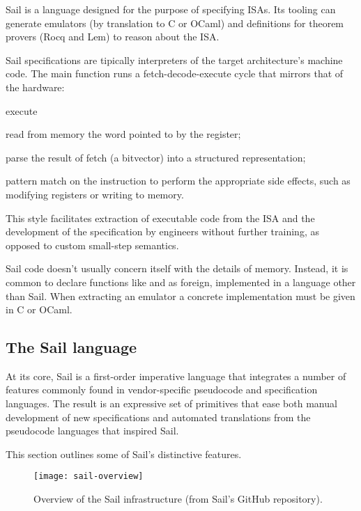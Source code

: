 Sail \cite{Armstrong} is a language designed for the purpose of specifying ISAs. Its tooling can generate emulators (by translation to C or OCaml) and definitions for theorem provers (\eg Rocq and Lem) to reason about the ISA.

Sail specifications are tipically interpreters of the target architecture's machine code. The main function runs a fetch-decode-execute cycle that mirrors that of the hardware:
\begin{labeling}[~--]{execute}
\item[fetch] read from memory the word pointed to by the  register;
\item[decode] parse the result of fetch (a bitvector) into a structured representation;
\item[execute] pattern match on the instruction to perform the appropriate side effects, such as modifying registers or writing to memory.
\end{labeling}

This style facilitates extraction of executable code from the ISA and the development of the specification by engineers without further training, as opposed to \eg custom small-step semantics.

Sail code doesn't usually concern itself with the details of memory. Instead, it is common to declare functions like  and  as foreign, \ie implemented in a language other than Sail. When extracting an emulator a concrete implementation must be given in C or OCaml.

\subsection{The Sail language}

At its core, Sail is a first-order imperative language that integrates a number of features commonly found in vendor-specific pseudocode and specification languages. The result is an expressive set of primitives that ease both manual development of new specifications and automated translations from the pseudocode languages that inspired Sail.

This section outlines some of Sail's distinctive features.

\begin{figure}
  \centering
  \texttt{[image: sail-overview]}
  \caption{Overview of the Sail infrastructure (from Sail's GitHub repository).}
  \label{fig:sail-overview}
\end{figure}

